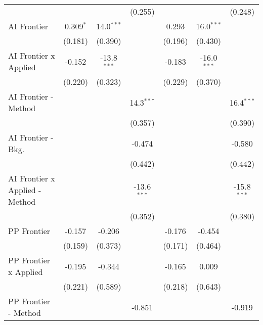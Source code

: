 \begin{tabular}{lcccccc}
                                  &                &                & (0.255)        &                &                & (0.248)\\   
   AI Frontier                    & 0.309$^{*}$    & 14.0$^{***}$   &                & 0.293          & 16.0$^{***}$   &   \\   
                                  & (0.181)        & (0.390)        &                & (0.196)        & (0.430)        &   \\   
   AI Frontier x Applied          & -0.152         & -13.8$^{***}$  &                & -0.183         & -16.0$^{***}$  &   \\   
                                  & (0.220)        & (0.323)        &                & (0.229)        & (0.370)        &   \\   
   AI Frontier - Method           &                &                & 14.3$^{***}$   &                &                & 16.4$^{***}$\\   
                                  &                &                & (0.357)        &                &                & (0.390)\\   
   AI Frontier - Bkg.             &                &                & -0.474         &                &                & -0.580\\   
                                  &                &                & (0.442)        &                &                & (0.442)\\   
   AI Frontier x Applied - Method &                &                & -13.6$^{***}$  &                &                & -15.8$^{***}$\\   
                                  &                &                & (0.352)        &                &                & (0.380)\\   
   PP Frontier                    & -0.157         & -0.206         &                & -0.176         & -0.454         &   \\   
                                  & (0.159)        & (0.373)        &                & (0.171)        & (0.464)        &   \\   
   PP Frontier x Applied          & -0.195         & -0.344         &                & -0.165         & 0.009          &   \\   
                                  & (0.221)        & (0.589)        &                & (0.218)        & (0.643)        &   \\   
   PP Frontier - Method           &                &                & -0.851         &                &                & -0.919\\   

\end{tabular}
